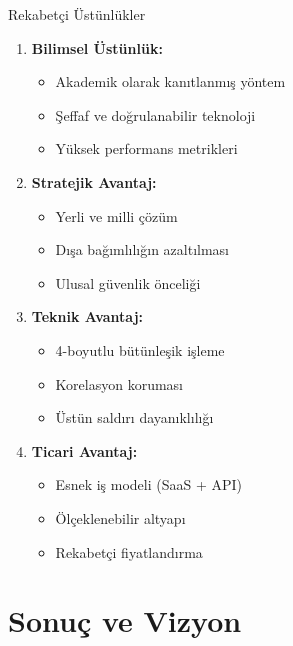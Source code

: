 \documentclass[aspectratio=169,xcolor={dvipsnames}]{beamer}
\begin{document}
\begin{frame}{Rekabetçi Üstünlükler}
\begin{enumerate}
\item \textbf{Bilimsel Üstünlük:}
\begin{itemize}
\item Akademik olarak kanıtlanmış yöntem
\item Şeffaf ve doğrulanabilir teknoloji
\item Yüksek performans metrikleri
\end{itemize}

\item \textbf{Stratejik Avantaj:}
\begin{itemize}
\item Yerli ve milli çözüm
\item Dışa bağımlılığın azaltılması
\item Ulusal güvenlik önceliği
\end{itemize}

\item \textbf{Teknik Avantaj:}
\begin{itemize}
\item 4-boyutlu bütünleşik işleme
\item Korelasyon koruması
\item Üstün saldırı dayanıklılığı
\end{itemize}

\item \textbf{Ticari Avantaj:}
\begin{itemize}
\item Esnek iş modeli (SaaS + API)
\item Ölçeklenebilir altyapı
\item Rekabetçi fiyatlandırma
\end{itemize}
\end{enumerate}
\end{frame}

\section{Sonuç ve Vizyon}
\end{document}
